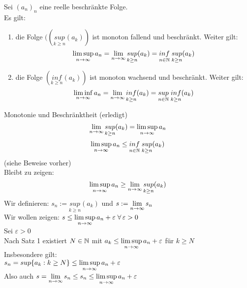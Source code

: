 \documentclass[../ana1u.tex]{subfiles}
\begin{document}
\begin{lem}
    Sei \((a_n)_n\) eine reelle beschränkte Folge.\\
    Es gilt: 
    \begin{enumerate}
        \item 
            die Folge \(((\underset{k \geq n}{sup}(a_k))\) ist monoton fallend und beschränkt. Weiter gilt:
            \[\limsup\limits_{n\rightarrow\infty} a_n = \lim\limits_{n\rightarrow\infty} \underset{k \geq n}{sup} (a_k) = \underset{n \in \mathbb{N}}{inf} \; \underset{k \geq n}{sup} (a_k)\]
        \item 
            die Folge \((\underset{k \geq n}{inf} (a_k))\) ist monoton wachsend und beschränkt. Weiter gilt:
            \[\liminf\limits_{n\rightarrow\infty} a_n = \lim\limits_{n\rightarrow\infty} \underset{k \geq n}{inf} (a_k) = \underset{n \in \mathbb{N}}{sup} \; \underset{k \geq n}{inf} (a_k)\]
    \end{enumerate}		
\end{lem}
\begin{bew}
    Monotonie und Beschränktheit (erledigt)\\
    \[\lim\limits_{n\rightarrow\infty} \underset{k \geq n}{sup} (a_k) = \limsup\limits_{n\rightarrow\infty} a_n\]
    \[\limsup\limits_{n\rightarrow\infty} a_n \leq \underset{n \in \mathbb{N}}{inf} \; \underset{k \geq n}{sup} (a_k)\]
    (siehe Beweise vorher)\\
    Bleibt zu zeigen:
    \[\limsup\limits_{n\rightarrow\infty} a_n \geq \lim\limits_{n\rightarrow\infty} \underset{k \geq n}{sup} (a_k)\]
    Wir definieren: \(s_n := \underset{k \geq n}{sup} (a_k)\) und \(s := \lim\limits_{n\rightarrow\infty} s_n\)\\
    Wir wollen zeigen: \(s \leq \limsup\limits_{n\rightarrow\infty} a_n + \varepsilon \; \forall \, \varepsilon > 0\)\\
    Sei \(\varepsilon > 0\)\\
    Nach Satz 1 existiert \(N \in \mathbb{N}\) mit \(a_k \leq \limsup\limits_{n\rightarrow\infty} a_n + \varepsilon\) für \(k \geq N\)\\
    Insbesondere gilt:\\
    \(s_n = sup\{a_k: k \geq N\} \leq \limsup\limits_{n\rightarrow\infty} a_n + \varepsilon\)\\
    Also auch \(s = \lim\limits_{n\rightarrow\infty} s_n \leq s_n \leq \limsup\limits_{n\rightarrow\infty} a_n + \varepsilon\)\\
\end{bew}	
\end{document}
